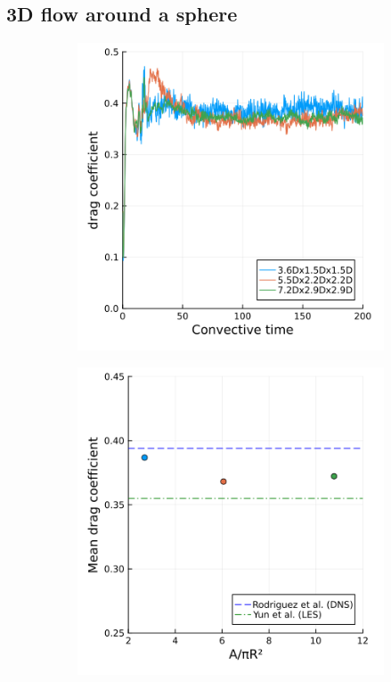 \documentclass[final,1p,times]{elsarticle}
\begin{document}
\subsection{3D flow around a sphere}

\begin{figure}
    \centering
    \begin{subfigure}{.4\textwidth}
        \centering
        \includegraphics[width=\textwidth]{tex//fig/drag.png}
    \end{subfigure}%
    \begin{subfigure}{.4\textwidth}
        \centering
        \includegraphics[width=\textwidth]{tex/fig/validation_sphere.png}

\end{subfigure}
\end{figure}
\end{document}
